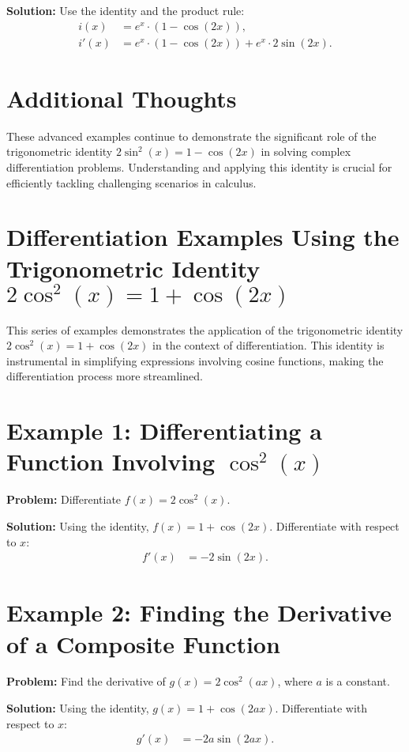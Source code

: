 \documentclass[a4paper,12pt]{book}
\newcounter{problem}
\newcounter{example}
\begin{document}
\textbf{Solution:}
Use the identity and the product rule:
\begin{align*}
i(x) &= e^x \cdot (1 - \cos(2x)), \\
i'(x) &= e^x \cdot (1 - \cos(2x)) + e^x \cdot 2 \sin(2x).
\end{align*}

\section*{Additional Thoughts}
These advanced examples continue to demonstrate the significant role of the trigonometric identity \(2 \sin^2(x) = 1 - \cos(2x)\) in solving complex differentiation problems. Understanding and applying this identity is crucial for efficiently tackling challenging scenarios in calculus.

\section*{Differentiation Examples Using the Trigonometric Identity \(2 \cos^2(x) = 1 + \cos(2x)\)}
This series of examples demonstrates the application of the trigonometric identity \(2 \cos^2(x) = 1 + \cos(2x)\) in the context of differentiation. This identity is instrumental in simplifying expressions involving cosine functions, making the differentiation process more streamlined.

\section*{Example 1: Differentiating a Function Involving \(\cos^2(x)\)}
\textbf{Problem:} Differentiate \(f(x) = 2 \cos^2(x)\).

\textbf{Solution:}
Using the identity, \(f(x) = 1 + \cos(2x)\). Differentiate with respect to \(x\):
\begin{align*}
f'(x) &= -2 \sin(2x).
\end{align*}

\section*{Example 2: Finding the Derivative of a Composite Function}
\textbf{Problem:} Find the derivative of \(g(x) = 2 \cos^2(ax)\), where \(a\) is a constant.

\textbf{Solution:}
Using the identity, \(g(x) = 1 + \cos(2ax)\). Differentiate with respect to \(x\):
\begin{align*}
g'(x) &= -2a \sin(2ax).
\end{align*}
\end{document}
